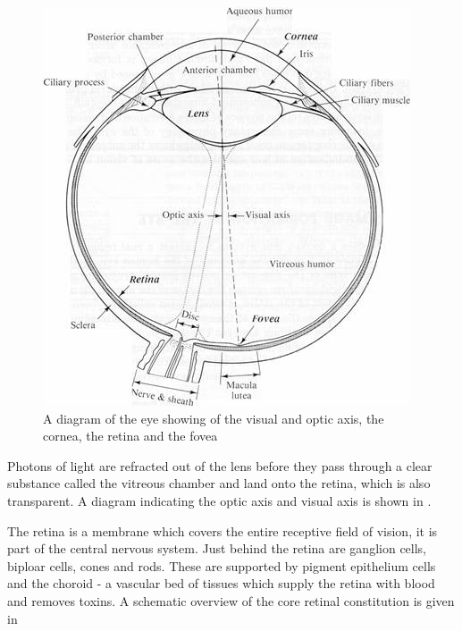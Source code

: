 \begin{figure}[!htbp]
 \centering
   \includegraphics{figures/eye_diagram}
 \caption{A diagram of the eye showing of the visual
  and optic axis, the cornea, the retina and the fovea}
 \label{fig:optic_axis}
\end{figure}

Photons of light are refracted out of the lens before they pass through
a clear substance called the vitreous chamber and land onto the retina,
which is also transparent. A diagram indicating the optic axis and
visual axis is shown in .

The retina is a membrane which covers the entire receptive field of
vision, it is part of the central nervous system.\cite{rogers1983neurite}
Just behind the retina are ganglion cells, biploar cells, cones and rods.
These are supported by pigment epithelium cells and the choroid - a vascular
bed of tissues which supply the retina with blood and removes toxins.
\cite{lutty1996localization} A schematic overview of the core retinal
constitution is given in 

